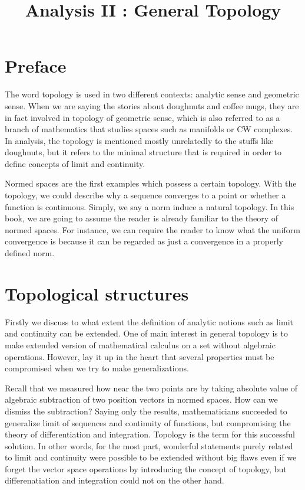 \documentclass{../crs}
\title{Analysis II : General Topology}
\begin{document}
\maketitle
\tableofcontents

\frontmatter


\chapter{Preface}

The word topology is used in two different contexts: analytic sense and geometric sense.
When we are saying the stories about doughnuts and coffee mugs, they are in fact involved in topology of geometric sense, which is also referred to as a branch of mathematics that studies spaces such as manifolds or CW complexes.
In analysis, the topology is mentioned mostly unrelatedly to the stuffs like doughnuts, but it refers to the minimal structure that is required in order to define concepts of limit and continuity.

Normed spaces are the first examples which possess a certain topology.
With the topology, we could describe why a sequence converges to a point or whether a function is continuous.
Simply, we say a norm induce a natural topology.
In this book, we are going to assume the reader is already familiar to the theory of normed spaces.
For instance, we can require the reader to know what the uniform convergence is because it can be regarded as just a convergence in a properly defined norm.





\mainmatter


\chapter{Topological structures}

Firstly we discuss to what extent the definition of analytic notions such as limit and continuity can be extended.
One of main interest in general topology is to make extended version of mathematical calculus on a set without algebraic operations.
However, lay it up in the heart that several properties must be compromised when we try to make generalizations.

Recall that we measured how near the two points are by taking absolute value of algebraic subtraction of two position vectors in normed spaces.
How can we dismiss the subtraction?
Saying only the results, mathematicians succeeded to generalize limit of sequences and continuity of functions, but compromising the theory of differentiation and integration.
Topology is the term for this successful solution.
In other words, for the most part, wonderful statements purely related to limit and continuity were possible to be extended without big flaws even if we forget the vector space operations by introducing the concept of topology, but differenatiation and integration could not on the other hand.
 
\end{document}
